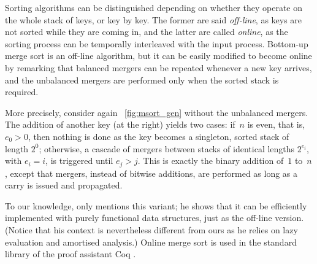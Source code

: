 Sorting algorithms can be distinguished depending on whether they
operate on the whole stack of keys, or key by key. The former are said
\emph{off\hyp{}line}, as keys are not sorted while they are coming in,
and the latter are called \emph{online}, as the sorting process
can be temporally interleaved with the input process. Bottom\hyp{}up
merge sort is an off\hyp{}line algorithm, but it can be easily
modified to become online by remarking that balanced mergers
can be repeated whenever a new key arrives, and the unbalanced
mergers are performed only when the sorted stack is required.

More precisely, consider again \fig~\ref{fig:msort_gen}
 without the unbalanced mergers. The addition
of another key (at the right) yields two cases: if~\(n\) is even, that
is, \(e_0>0\), then nothing is done as the key becomes a singleton,
sorted stack of length \(2^0\); otherwise, a cascade of mergers
between stacks of identical lengths \(2^{e_i}\), with \(e_i=i\), is
triggered until \(e_j > j\). This is exactly the binary addition
of~\(1\) to~\(n\), except that mergers, instead of bitwise additions,
are performed as long as a carry is issued and propagated.

To our knowledge, only \cite{Okasaki_1998a} mentions this variant; he
shows that it can be efficiently implemented with purely functional
data structures, just as the off\hyp{}line version. (Notice that his
context is nevertheless different from ours as he relies on lazy
evaluation and amortised analysis.) Online merge sort is used in the
standard library of the proof assistant 
\textsf{Coq} \citep{BertotCasteran_2004}.

